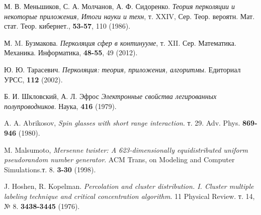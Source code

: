 \begin{thebibliography}{99}

М. В. Меньшиков, С. А. Молчанов, А. Ф. Сидоренко. \emph{Теория перколяции и некоторые приложения, Итоги науки и техн}, т. XXIV, Сер. Теор. вероятн. Мат. стат. Теор. кибернет.,   \textbf{53-57}, 110 (1986).


М. M. Бузмакова. \emph{Перколяция сфер в континууме}, т. XII. Сер. Математика. Механика. Информатика, \textbf{48-55}, 49 (2012).

Ю. Ю. Тарасевич. \emph{Перколяция: теория, приложения, алгоритмы}. Едиториал УРСС, \textbf{112} (2002). 

Б. И. Шкловский, А. Л. Эфрос \emph{Электронные свойства легированных полупроводников}. Наука, \textbf{416} (1979). 

A. A. Abrikosov, \emph{Spin glasses with short range interaction}.  т. 29. Adv. Phys. \textbf{869-946} (1980). 

M. Malsumoto, \emph{Mersenne twister: A 623-dimensionally equidistributed uniform pseudorandom number generator}. ACM Trans, on Modeling and Computer Simulations.т. 8. \textbf{3-30} (1998). 

J. Hoshen, R. Kopelman. \emph{Percolation and cluster distribution. I. Cluster multiple labeling technique and critical concentration algorithm}. 11 Physical Review. т. 14,
№ 8. \textbf{3438-3445} (1976). 



\end{thebibliography}
